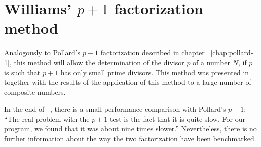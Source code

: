 \chapter{Williams' $p+1$ factorization method \label{chap:william+1}}

Analogously to Pollard's $p-1$ factorization described in chapter
~\ref{chap:pollard-1}, this method will allow the determination of the divisor
$p$ of a number $N$, if $p$ is such that $p+1$ has only small prime divisors.
This method was presented in ~\cite{Williams:p+1} together with the results of
the application of this method to a large number of composite numbers.

\begin{remark}
  In the end of ~\cite{Williams:p+1}, there is a small performance comparison
  with Pollard's $p-1$:
  ``The real problem with the $p+1$ test is the fact that it is quite slow. For
  our program, we found that it was about nine times slower.''
  Nevertheless, there is no further information about the way the two
  factorization have been benchmarked.
\end{remark}
